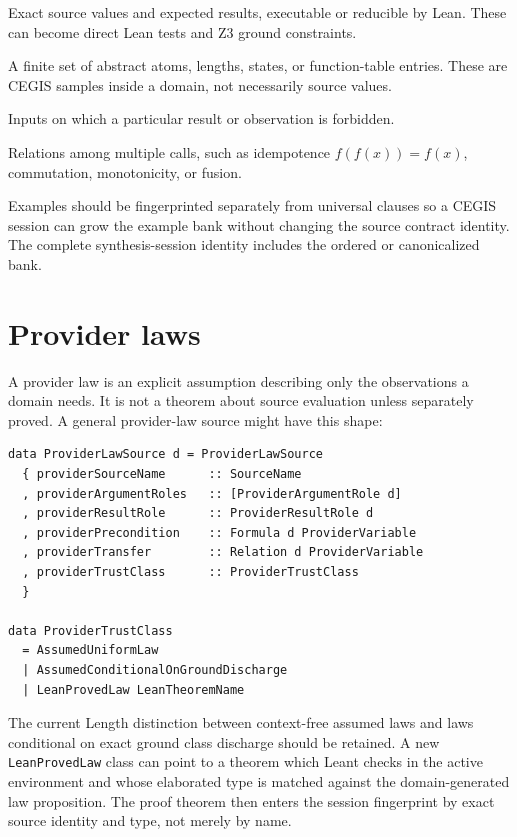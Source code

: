\documentclass[11pt,oneside]{report}
\newcommand{\code}[1]{\texttt{#1}}
\begin{document}
\begin{description}[leftmargin=2.2em,style=nextline]
\item[Concrete examples.] Exact source values and expected results, executable or reducible by Lean. These can become direct Lean tests and Z3 ground constraints.
\item[Symbolic examples.] A finite set of abstract atoms, lengths, states, or function-table entries. These are CEGIS samples inside a domain, not necessarily source values.
\item[Negative examples.] Inputs on which a particular result or observation is forbidden.
\item[Metamorphic examples.] Relations among multiple calls, such as idempotence $f(f(x))=f(x)$, commutation, monotonicity, or fusion.
\end{description}

Examples should be fingerprinted separately from universal clauses so a CEGIS session can grow the example bank without changing the source contract identity. The complete synthesis-session identity includes the ordered or canonicalized bank.

\section{Provider laws}

A provider law is an explicit assumption describing only the observations a domain needs. It is not a theorem about source evaluation unless separately proved. A general provider-law source might have this shape:

\begin{lstlisting}[language=HaskellX,caption={General shape of an explicit provider law.},label={lst:provider-law}]
data ProviderLawSource d = ProviderLawSource
  { providerSourceName      :: SourceName
  , providerArgumentRoles   :: [ProviderArgumentRole d]
  , providerResultRole      :: ProviderResultRole d
  , providerPrecondition    :: Formula d ProviderVariable
  , providerTransfer        :: Relation d ProviderVariable
  , providerTrustClass      :: ProviderTrustClass
  }

data ProviderTrustClass
  = AssumedUniformLaw
  | AssumedConditionalOnGroundDischarge
  | LeanProvedLaw LeanTheoremName
\end{lstlisting}

The current Length distinction between context-free assumed laws and laws conditional on exact ground class discharge should be retained. A new \code{LeanProvedLaw} class can point to a theorem which Leant checks in the active environment and whose elaborated type is matched against the domain-generated law proposition. The proof theorem then enters the session fingerprint by exact source identity and type, not merely by name.
\end{document}
